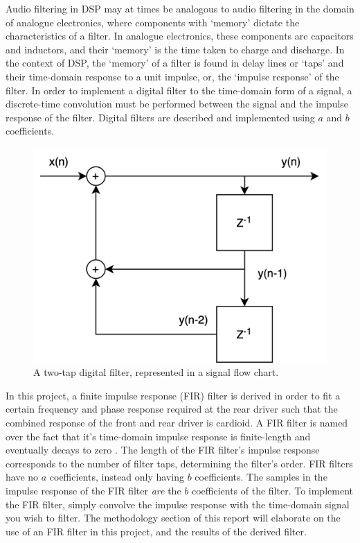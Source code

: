\documentclass{report}
\begin{document}
        Audio filtering in DSP may at times be analogous to audio filtering in the domain of analogue electronics, where components with `memory' dictate the characteristics of a filter. 
        In analogue electronics, these components are capacitors and inductors, and their `memory' is the time taken to charge and discharge.
        In the context of DSP, the `memory' of a filter is found in delay lines or `taps' and their time-domain response to a unit impulse, or, the `impulse response' of the filter.
        In order to implement a digital filter to the time-domain form of a signal, a discrete-time convolution must be performed between the signal and the impulse response of the filter.
        Digital filters are described and implemented using $a$ and $b$ coefficients.

        \begin{figure}[H]
            \centering
            \includegraphics[width = 0.4\linewidth]{figs/filterGraph.png}
            \caption{A two-tap digital filter, represented in a signal flow chart.}
            \label{filterGraph}
        \end{figure}
        
        In this project, a finite impulse response (FIR) filter is derived in order to fit a certain frequency and phase response required at the rear driver such that the combined response of the front and rear driver is cardioid.
        A FIR filter is named over the fact that it's time-domain impulse response is finite-length and eventually decays to zero \cite{litwin2000fir}.
        The length of the FIR filter's impulse response corresponds to the number of filter taps, determining the filter's order.
        FIR filters have no $a$ coefficients, instead only having $b$ coefficients.
        The samples in the impulse response of the FIR filter \textit{are} the $b$ coefficients of the filter.
        To implement the FIR filter, simply convolve the impulse response with the time-domain signal you wish to filter.
        The methodology section of this report will elaborate on the use of an FIR filter in this project, and the results of the derived filter.
\end{document}
